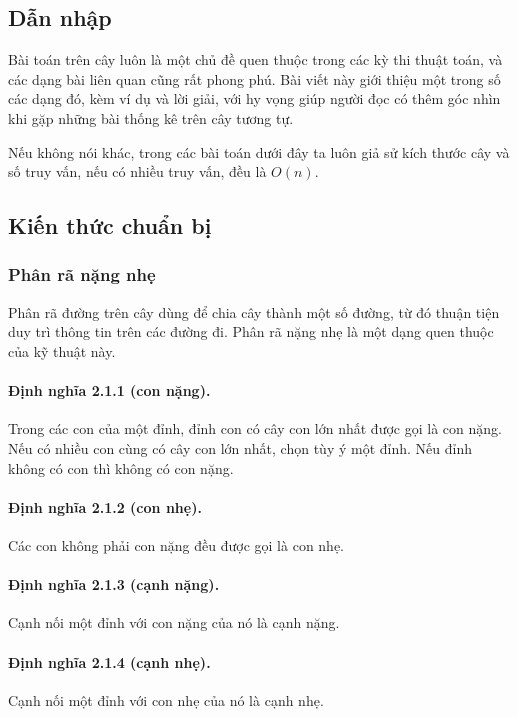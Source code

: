 \documentclass[11pt]{article}
\begin{document}
\subsection{Dẫn nhập}

Bài toán trên cây luôn là một chủ đề quen thuộc trong các kỳ thi thuật toán, và
các dạng bài liên quan cũng rất phong phú. Bài viết này giới thiệu một trong số
các dạng đó, kèm ví dụ và lời giải, với hy vọng giúp người đọc có thêm góc nhìn
khi gặp những bài thống kê trên cây tương tự.

Nếu không nói khác, trong các bài toán dưới đây ta luôn giả sử kích thước cây
và số truy vấn, nếu có nhiều truy vấn, đều là \(O(n)\).

\subsection{Kiến thức chuẩn bị}

\subsubsection{Phân rã nặng nhẹ}

Phân rã đường trên cây dùng để chia cây thành một số đường, từ đó thuận tiện
duy trì thông tin trên các đường đi. Phân rã nặng nhẹ là một dạng quen thuộc
của kỹ thuật này.

\paragraph{Định nghĩa 2.1.1 (con nặng).}
Trong các con của một đỉnh, đỉnh con có cây con lớn nhất được gọi là con nặng.
Nếu có nhiều con cùng có cây con lớn nhất, chọn tùy ý một đỉnh. Nếu đỉnh không
có con thì không có con nặng.

\paragraph{Định nghĩa 2.1.2 (con nhẹ).}
Các con không phải con nặng đều được gọi là con nhẹ.

\paragraph{Định nghĩa 2.1.3 (cạnh nặng).}
Cạnh nối một đỉnh với con nặng của nó là cạnh nặng.

\paragraph{Định nghĩa 2.1.4 (cạnh nhẹ).}
Cạnh nối một đỉnh với con nhẹ của nó là cạnh nhẹ.
\end{document}
